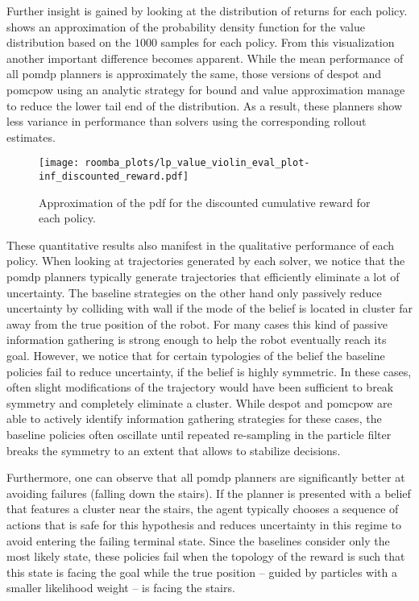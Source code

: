 Further insight is gained by looking at the distribution of returns for each
policy.  shows an approximation of the
probability density function for the value distribution based on the $1000$
samples for each policy. From this visualization another important difference
becomes apparent. While the mean performance of all \ac{pomdp} planners is
approximately the same, those versions of \ac{despot} and \ac{pomcpow} using an
analytic strategy for bound and value approximation manage to reduce the lower
tail end of the distribution. As a result, these planners show less variance in
performance than solvers using the corresponding rollout estimates.

\begin{figure}[H]
  \centering
  \texttt{[image: roomba\_plots/lp\_value\_violin\_eval\_plot-inf\_discounted\_reward.pdf]}
  \caption{Approximation of the \acf{pdf} for the discounted cumulative reward
  for each policy.}
  \label{fig:lp-value-violin-inf-discounted}
\end{figure}

These quantitative results also manifest in the qualitative performance of each
policy. When looking at trajectories generated by each solver, we notice that
the \ac{pomdp} planners typically generate trajectories that efficiently
eliminate a lot of uncertainty. The baseline strategies on the other hand only
passively reduce uncertainty by colliding with wall if the mode of the belief
is located in cluster far away from the true position of the robot. For many
cases this kind of passive information gathering is strong enough to help the
robot eventually reach its goal. However, we notice that for certain
typologies of the belief the baseline policies fail to reduce uncertainty, \eg
if the belief is highly symmetric. In these cases, often slight modifications
of the trajectory would have been sufficient to break symmetry and completely
eliminate a cluster. While \ac{despot} and \ac{pomcpow} are able to actively
identify information gathering strategies for these cases, the baseline
policies often oscillate until repeated re-sampling in the particle filter
breaks the symmetry to an extent that allows to stabilize decisions.

Furthermore, one can observe that all \ac{pomdp} planners are significantly
better at avoiding failures (\ie falling down the stairs). If the planner is
presented with a belief that features a cluster near the stairs, the agent
typically chooses a sequence of actions that is safe for this hypothesis and
reduces uncertainty in this regime to avoid entering the failing terminal
state. Since the baselines consider only the most likely state, these policies
fail when the topology of the reward is such that this state is facing
the goal while the true position -- guided by particles with a smaller
likelihood weight -- is facing the stairs.


